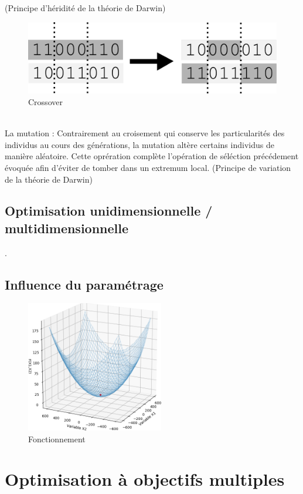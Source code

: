 \documentclass[12pt]{report}
\begin{document}
        (Principe d'héridité de la théorie de Darwin)
        \begin{figure}
          \centering
          \includegraphics{img/crossover.png}
          \caption{Crossover}
        \end{figure}
        \\
        La mutation :
        Contrairement au croisement qui conserve les particularités des individus au cours des générations, la mutation altère certains individus de manière aléatoire. Cette oprération complète l'opération de séléction précédement évoquée afin d'éviter de tomber dans un extremum local.
        (Principe de variation de la théorie de Darwin)



    \section{Optimisation unidimensionnelle / multidimensionnelle}.

    \section{Influence du paramétrage }

    \begin{figure}
      \centering
      \includegraphics[width=6cm]{img/3,2.png}
      \caption{Fonctionnement}
    \end{figure}



  \chapter{Optimisation à objectifs multiples}
\end{document}
